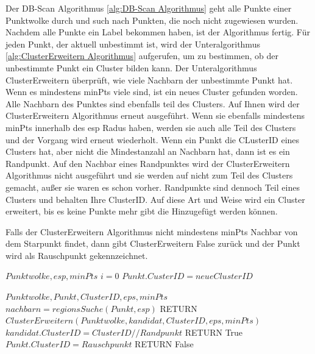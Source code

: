 Der DB-Scan Algorithmus \ref{alg:DB-Scan Algorithmus} geht alle Punkte einer Punktwolke durch und such nach Punkten, die noch nicht zugewiesen wurden. Nachdem alle Punkte ein Label bekommen haben, ist der Algorithmus fertig. 
Für jeden Punkt, der aktuell unbestimmt ist, wird der Unteralgorithmus \ref{alg:ClusterErweitern Algorithmus} aufgerufen, um zu bestimmen, ob der unbestimmte Punkt ein Cluster bilden kann.
Der Unteralgorithmus ClusterErweitern überprüft, wie viele Nachbarn der unbestimmte Punkt hat. Wenn es mindestens minPts viele sind, ist ein neues Cluster gefunden worden. Alle Nachbarn des Punktes sind ebenfalls teil des Clusters. 
Auf Ihnen wird der ClusterErweitern Algorithmus erneut ausgeführt. Wenn sie ebenfalls mindestens minPts innerhalb des esp Radus haben, werden sie auch alle Teil des Clusters und der Vorgang wird erneut wiederholt. Wenn ein Punkt die CLusterID eines Clusters hat, 
aber nicht die Mindestanzahl an Nachbarn hat, dann ist es ein Randpunkt. Auf den Nachbar eines Randpunktes wird der ClusterErweitern Algorithmus nicht ausgeführt und sie werden auf nicht zum Teil des Clusters gemacht, außer sie waren es schon vorher. 
Randpunkte sind dennoch Teil eines Clusters und behalten Ihre ClusterID.
Auf diese Art und Weise wird ein Cluster erweitert, bis es keine Punkte mehr gibt die Hinzugefügt werden können.

Falls der ClusterErweitern Algorithmus nicht mindestens minPts Nachbar von dem Starpunkt findet, dann gibt ClusterErweitern False zurück und der Punkt wird als Rauschpunkt gekennzeichnet.

\begin{algorithm}[t]
    \centering
    \caption[DB-Scan Algorithmus]{DB-Scan Algorithmus} \label{alg:DB-Scan Algorithmus}
    \begin{algorithmic}
    \REQUIRE $Punktwolke, esp, minPts$
    \STATE $i = 0$
    \STATE $Punkt.CusterID = neue ClusterID$
    \ENDIF
    \ENDIF
    \ENDFOR
    \end{algorithmic}
\end{algorithm}

\begin{algorithm}[t]
    \centering
    \caption[ClusterErweitern Algorithmus]{ClusterErweitern Algorithmus} \label{alg:ClusterErweitern Algorithmus}
    \begin{algorithmic}
    \REQUIRE $Punktwolke, Punkt, ClusterID, eps, minPts$
    \STATE $nachbarn = regionsSuche(Punkt,esp)$
                \STATE RETURN $ClusterErweitern(Punktwolke, kandidat, ClusterID, eps, minPts)$
            \ENDIF
        \ENDFOR
    \ELSE
            \STATE $kandidat.ClusterID = ClusterID //Randpunkt$ 
            \STATE RETURN True
        \ELSE
            \STATE $Punkt.ClusterID = Rauschpunkt$
            \STATE RETURN False
        \ENDIF
    \ENDIF
    \end{algorithmic}
\end{algorithm}

